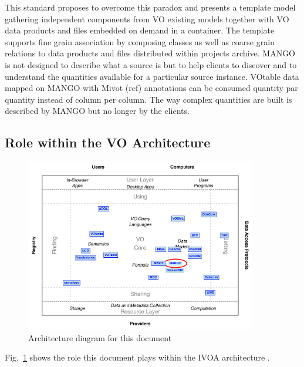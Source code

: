 \documentclass[11pt,a4paper]{ivoa}
\begin{document}
This standard proposes to overcome this paradox and presents a template model gathering independent
components from VO existing models together with VO data products and files embedded on demand in a container.
The template supports fine grain association by composing classes as well as coarse grain relations
to data products and files distributed within projects archive.
MANGO is not designed to describe what a source is but to help clients to discover and to understand
the quantities available for a particular source instance.
VOtable data mapped on MANGO with Mivot (ref) annotations can be consumed quantity 
par quantity instead of column per column.
The way complex quantities are built is  described by MANGO but no longer by the clients.

\subsection{Role within the VO Architecture}

\begin{figure}
\centering


\includegraphics[width=0.9\textwidth]{role_diagram.pdf}
\caption{Architecture diagram for this document}
\label{fig:archdiag}
\end{figure}

Fig.~\ref{fig:archdiag} shows the role this document plays within the
IVOA architecture \citep{2010ivoa.rept.1123A}.
\end{document}
